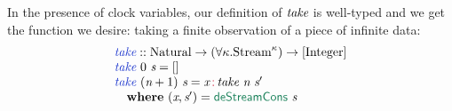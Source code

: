 In the presence of clock variables, our definition of $\textit{take}$
is well-typed and we get the function we desire: taking a finite
observation of a piece of infinite data:
\begin{displaymath}
  \begin{array}{l}
    \defn{take} :: \tyname{Natural} \to (\forall \kappa. \tyname{Stream}^\kappa) \to [\tyname{Integer}] \\
    \defn{take}\ 0\ \ident{s} = [] \\
    \defn{take}\ (\ident{n}+1)\ \ident{s} = \ident{x} \mathop{\cons{:}} \ident{take}\ \ident{n}\ \ident{s$'$} \\
    \quad \kw{where}\ (\ident{x}, \ident{s$'$}) = \elim{deStreamCons}\ \ident{s}
  \end{array}
\end{displaymath}

